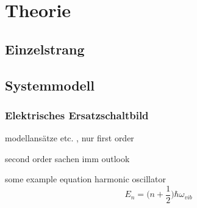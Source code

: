 \chapter{Theorie}
\label{cha:theory}

\section{Einzelstrang}
\label{sec:lowlevel}

\section{Systemmodell}
\label{sec:highlevel}

\subsection{Elektrisches Ersatzschaltbild}
\label{sec:electrical circuit}

modellansätze etc. , nur first order

second order sachen imm outlook

some example equation
harmonic oscillator
\begin{equation} \label{eq:harmonicoszillator}
	E_n = \Biggl(n+\frac{1}{2} \Biggr)\hbar\omega_{vib}
\end{equation}